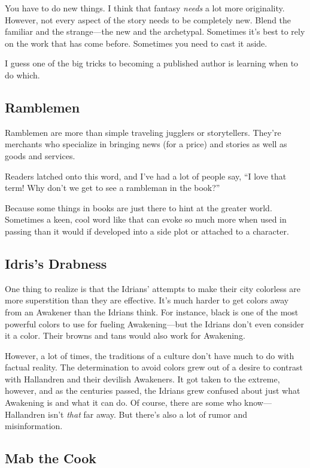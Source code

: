 You have to do new things. I think that fantasy \textit{needs} a lot more originality. However, not every aspect of the story needs to be completely new. Blend the familiar and the strange—the new and the archetypal. Sometimes it’s best to rely on the work that has come before. Sometimes you need to cast it aside.

I guess one of the big tricks to becoming a published author is learning when to do which.

\subsection*{Ramblemen}

Ramblemen are more than simple traveling jugglers or storytellers. They’re merchants who specialize in bringing news (for a price) and stories as well as goods and services.

Readers latched onto this word, and I’ve had a lot of people say, “I love that term! Why don’t we get to see a rambleman in the book?”

Because some things in books are just there to hint at the greater world. Sometimes a keen, cool word like that can evoke so much more when used in passing than it would if developed into a side plot or attached to a character.

\subsection*{Idris’s Drabness}

One thing to realize is that the Idrians’ attempts to make their city colorless are more superstition than they are effective. It’s much harder to get colors away from an Awakener than the Idrians think. For instance, black is one of the most powerful colors to use for fueling Awakening—but the Idrians don’t even consider it a color. Their browns and tans would also work for Awakening.

However, a lot of times, the traditions of a culture don’t have much to do with factual reality. The determination to avoid colors grew out of a desire to contrast with Hallandren and their devilish Awakeners. It got taken to the extreme, however, and as the centuries passed, the Idrians grew confused about just what Awakening is and what it can do. Of course, there are some who know—Hallandren isn’t \textit{that} far away. But there’s also a lot of rumor and misinformation.

\subsection*{Mab the Cook}

